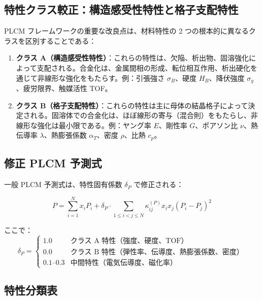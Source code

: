 \documentclass[11pt,a4paper]{article}
\theoremstyle{remark}
\begin{document}
	\subsection{特性クラス較正：構造感受性特性と格子支配特性}
	\label{subsec:property-class-calibration}
	
	PLCM フレームワークの重要な改良点は、材料特性の 2 つの根本的に異なるクラスを区別することである：
	
	\begin{enumerate}
		\item \textbf{クラス A（構造感受性特性）}：これらの特性は、欠陥、析出物、固溶強化によって支配される。合金化は、金属間相の形成、転位相互作用、析出硬化を通じて非線形な強化をもたらす。例：引張強さ \(\sigma_B\)、硬度 \(H_B\)、降伏強度 \(\sigma_y\)、疲労限界、触媒活性 TOF。
		
		\item \textbf{クラス B（格子支配特性）}：これらの特性は主に母体の結晶格子によって決定される。固溶体での合金化は、ほぼ線形の寄与（混合則）をもたらし、非線形な強化は最小限である。例：ヤング率 \(E\)、剛性率 \(G\)、ポアソン比 \(\nu\)、熱伝導率 \(\lambda\)、熱膨張係数 \(\alpha_T\)、密度 \(\rho\)、比熱 \(c_p\)。
	\end{enumerate}
	
	\subsection{修正 PLCM 予測式}
	
	一般 PLCM 予測式は、特性固有係数 \(\delta_P\) で修正される：
	
	\begin{equation}
		\boxed{P = \sum_{i=1}^{N} x_i P_i + \delta_P \cdot \sum_{1\le i<j\le N} \kappa_{ij}^{(P)} x_i x_j (P_i - P_j)^2}
		\label{eq:plcm-modified}
	\end{equation}
	
	ここで：
	\[
	\delta_P = \begin{cases}
		1.0 & \text{クラス A 特性（強度、硬度、TOF）} \\
		0.0 & \text{クラス B 特性（弾性率、伝導度、熱膨張係数、密度）} \\
		0.1\text{--}0.3 & \text{中間特性（電気伝導度、磁化率）}
	\end{cases}
	\]
	
	\subsection{特性分類表}
	
\end{document}

